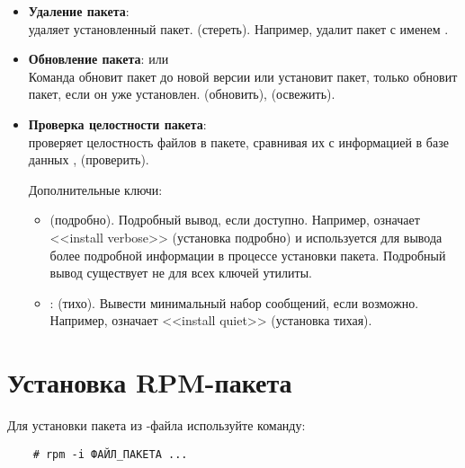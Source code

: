 \begin{itemize}
	\item \textbf{Удаление пакета}: \\
	 удаляет установленный пакет. 
	(стереть). Например,  удалит пакет с именем .

	\item \textbf{Обновление пакета}:  или \\
	Команда  обновит пакет до новой версии или установит пакет, 
	только обновит пакет, если он уже установлен.  (обновить),  (освежить).

	\item \textbf{Проверка целостности пакета}: \\
	 проверяет целостность файлов в пакете, сравнивая их с информацией в базе данных ,
	 (проверить).

	Дополнительные ключи:
	\begin{itemize}
		\item[] \textbf{} (подробно). Подробный вывод, если доступно. Например,  означает <<install verbose>>
	 (установка подробно) и используется для вывода более подробной информации в процессе установки пакета. Подробный вывод существует не для всех ключей утилиты.
                \item[] \textbf{}: (тихо). Вывести минимальный набор сообщений, если возможно. Например,  означает <<install quiet>> (установка тихая).
	\end{itemize}


\end{itemize}

\section{Установка RPM-пакета}

Для установки пакета из -файла используйте команду:
\begin{verbatim}
    # rpm -i ФАЙЛ_ПАКЕТА ...
\end{verbatim}

